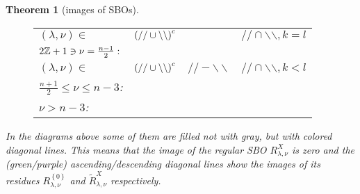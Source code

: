 \documentclass[12pt]{article} %
\newtheorem{theorem}{Theorem}
\theoremstyle{definition}
\theoremstyle{exampstyle} \newtheorem{examp}[theorem]{Theorem}
\newcommand{\odd}{2\Z+1}
\begin{document}
\begin{theorem}[images of SBOs]
\begin{enumerate}
\begin{figure}[H]
\begin{tabular}{m{3.5cm}ccc}
              $(\lambda,\nu)\in$&$\left(//\cup\backslash\backslash\right)^c$ && $//\cap\backslash\backslash,k=l$\\[15pt]
	      \vspace{-3cm}$\odd\ni\nu=\frac{n-1}{2}:$&\\[25pt]
	      $(\lambda,\nu)\in$&$\left(//\cup\backslash\backslash\right)^c$ & $//-\backslash\backslash$  & $//\cap\backslash\backslash,k< l$\\[15pt]
	      \vspace{-3cm}$\frac{n+1}{2}\le\nu\le n-3$:&\\[25pt]
	      \vspace{-3cm}$\nu>n-3$:&\\[15pt]
	    \end{tabular}
	  \end{figure}
	\end{enumerate}
	In the diagrams above some of them are filled not with gray, but with colored diagonal lines. This means that the image of the regular
	SBO $R_{\lambda,\nu}^X$ is zero and the (green/purple)
	ascending/descending diagonal lines show the images of its residues $R_{\lambda,\nu}^{ \left\{ 0 \right\}}$ and $\tilde{R}_{\lambda,\nu}^X$ respectively.


\end{theorem}
\end{document}
